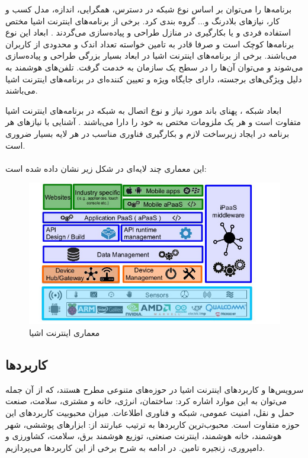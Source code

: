 برنامه‌ها را می‌توان بر اساس نوع شبکه در دسترس، همگرایی، اندازه، مدل کسب و کار، نیازهای بلادرنگ و... گروه بندی کرد. برخی از برنامه‌های اینترنت اشیا مختص استفاده فردی و یا بکارگیری در منازل طراحی و پیاده‌سازی می‌گردند . ابعاد این نوع برنامه‌ها کوچک است و صرفا قادر به تامین خواسته تعداد اندک و محدودی از کاربران می‌باشند.
برخی از برنامه‌های اینترنت اشیا در ابعاد بسیار بزرگی طراحی و پیاده‌سازی می‌شوند و می‌توان آن‌ها را در سطح یک سازمان به خدمت گرفت. تلفن‌های هوشمند به دلیل ویژگی‌های برجسته، دارای جایگاه ویژه و تعیین کننده‌ای در برنامه‌های اینترنت اشیا می‌باشند.


ابعاد شبکه ، پهنای باند مورد نیاز و نوع اتصال به شبکه در برنامه‌های اینترنت اشیا متفاوت است و هر یک  ملزومات مختص به خود را دارا می‌باشند . آشنایی با نیازهای هر برنامه در ایجاد زیرساخت لازم و بکارگیری فناوری مناسب در هر لایه بسیار ضروری است.\\
\\
این معماری چند لایه‌ای در شكل زیر نشان داده شده است:\\
\begin{figure}[!h]
	\centerline{\includegraphics[width=.8\textwidth]{iot-arc}}
	\caption{معماری اینترنت اشیا \cite{iot-arc}}
\end{figure}

\subsection{کاربردها}
سرویس‌ها و کاربردهای اینترنت اشیا در حوزه‌های متنوعی مطرح هستند، که از آن جمله می‌توان به این موارد اشاره کرد: ساختمان، انرژی، خانه و مشتری، سلامت، صنعت حمل و نقل، امنیت عمومی، شبكه و فناوری اطلاعات. میزان محبوبیت کاربردهای این حوزه متفاوت است. محبوب‌ترین کاربردها به ترتیب عبارتند از: ابزارهای پوششی، شهر هوشمند، خانه هوشمند، اینترنت صنعتی، توزیع هوشمند برق، سلامت، کشاورزی و دامپروری، زنجیره تامین. در ادامه به شرح برخی از این کاربردها می‌پردازیم.
